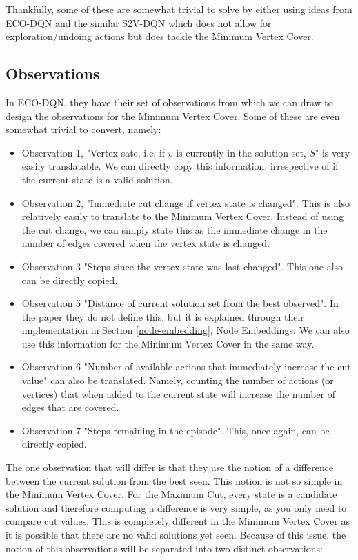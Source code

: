 \documentclass{article}
\begin{document}
Thankfully, some of these are somewhat trivial to solve by either using ideas from ECO-DQN \cite{eco-dqn} and the similar S2V-DQN \cite{s2v-dqn} which does not allow for exploration/undoing actions but does tackle the Minimum Vertex Cover.

\subsection{Observations}

In ECO-DQN, they have their set of observations from which we can draw to design the observations for the Minimum Vertex Cover. Some of these are even somewhat trivial to convert, namely:

\begin{itemize}
    \item Observation 1, "Vertex sate, i.e. if $v$ is currently in the solution set, $S$" is very easily translatable. We can directly copy this information, irrespective of if the current state is a valid solution.
    \item Observation 2, "Immediate cut change if vertex state is changed". This is also relatively easily to translate to the Minimum Vertex Cover. Instead of using the cut change, we can simply state this as the immediate change in the number of edges covered when the vertex state is changed. 
    \item Observation 3 "Steps since the vertex state was last changed". This one also can be directly copied.
    \item Observation 5 "Distance of current solution set from the best observed". In the paper they do not define this, but it is explained through their implementation in Section \ref{node-embedding}, Node Embeddings. We can also use this information for the Minimum Vertex Cover in the same way.
    \item Observation 6 "Number of available actions that immediately increase the cut value" can also be translated. Namely, counting the number of actions (or vertices) that when added to the current state will increase the number of edges that are covered.
    \item Observation 7 "Steps remaining in the episode". This, once again, can be directly copied.
\end{itemize}

The one observation that will differ is that they use the notion of a difference between the current solution from the best seen. This notion is not so simple in the Minimum Vertex Cover. For the Maximum Cut, every state is a candidate solution and therefore computing a difference is very simple, as you only need to compare cut values. This is completely different in the Minimum Vertex Cover as it is possible that there are no valid solutions yet seen. Because of this issue, the notion of this observations will be separated into two distinct observations:
\end{document}
